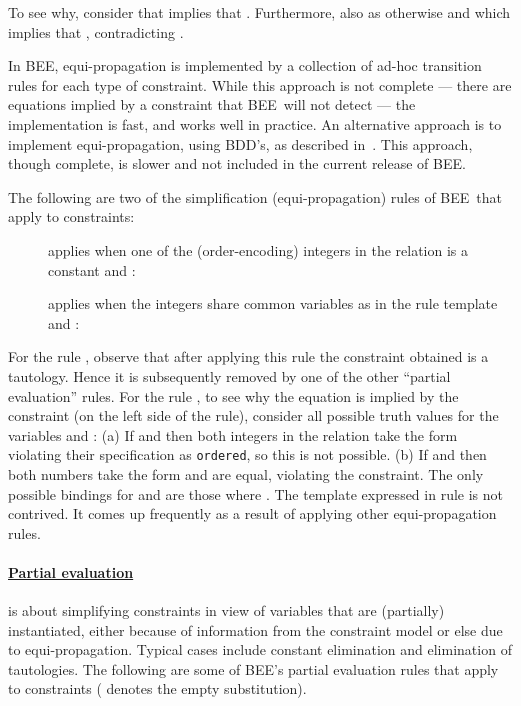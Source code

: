 \documentclass{tlp}
\newcommand{\bee}{\textsf{BEE}}
\begin{document}
To see why, consider that  implies that
. Furthermore, also  as
otherwise  and  which implies that
, contradicting .


In \bee, equi-propagation is implemented by a collection of ad-hoc
transition rules for each type of constraint. While this approach is
not complete --- there are equations implied by a constraint that
\bee\ will not detect --- the implementation is fast, and works well
in practice.
An alternative approach is to implement equi-propagation, using BDD's,
as described in~\cite{Metodi2011}. This approach, though complete, is
slower and not included in the current release of \bee.

The following are two of the simplification (equi-propagation) rules
of \bee\ that apply to  constraints:

\begin{description}
\item[] applies when one of the (order-encoding)
  integers in the relation is a constant and :



\item[] applies when the integers share common
  variables as in the rule template and :

\end{description}

For the  rule , observe that after applying this
rule the constraint obtained is a tautology. Hence it is subsequently
removed by one of the other ``partial evaluation'' rules.
For the rule , to see why the equation
 is implied by the constraint (on the left side of the rule),
consider all possible truth values for the variables  and :
(a) If  and  then both integers in the relation take the
form  violating their specification as
\texttt{ordered}, so this is not possible. (b) If  and 
then both numbers take the form  and are
equal, violating the  constraint. The only possible
bindings for  and  are those where . 
The template expressed in rule  is not contrived. It
comes up frequently as a result of applying other equi-propagation
rules. 

\vspace{-3mm}
\paragraph{\underline{Partial evaluation}} is about simplifying
constraints in view of variables that are (partially) instantiated,
either because of information from the constraint model or else due to
equi-propagation. Typical cases include constant elimination and
elimination of tautologies.
The following are some of \bee's partial evaluation rules that apply
to  constraints ( denotes the empty
substitution). 
\end{document}
